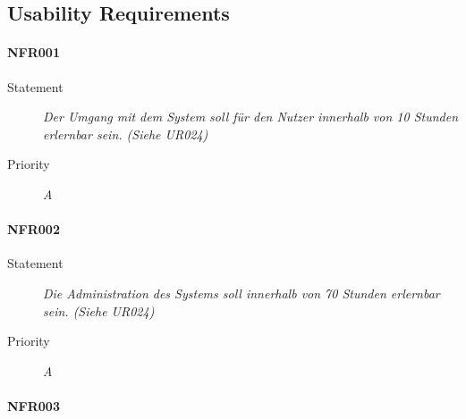 \subsection{Usability Requirements}

\paragraph{NFR001}
\begin{description}
\item[Statement] \textit{Der Umgang mit dem System soll für den Nutzer innerhalb von 10 Stunden erlernbar sein.
(Siehe UR024)
}
\item[Priority] \textit{A}
\end{description}

\paragraph{NFR002}
\begin{description}
\item[Statement] \textit{Die Administration des Systems soll innerhalb von 70 Stunden erlernbar sein.
(Siehe UR024)}
\item[Priority] \textit{A}
\end{description}

\paragraph{NFR003}

